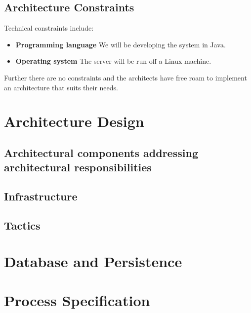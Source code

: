 \documentclass[hidelinks,english]{article}
\begin{document}
		\subsection{Architecture Constraints}
			Technical constraints include:
			\begin{itemize}
				\item \textbf{Programming language} We will be developing the system in Java.
				\item \textbf{Operating system} The server will be run off a Linux machine. 
			\end{itemize}
			Further there are no constraints and the architects have free roam to implement an architecture that suits their needs.
			
	\section{Architecture Design}
	
		\subsection{Architectural components addressing architectural responsibilities}
		
		\subsection{Infrastructure}
		
		\subsection{Tactics}
		
	\section{Database and Persistence}
	
	
	\section{Process Specification}
\end{document}
